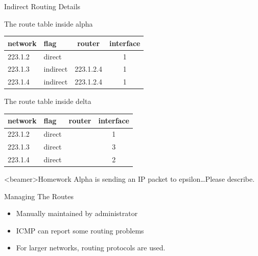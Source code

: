 \begin{frame}{Indirect Routing Details}
  \begin{iblock}{The route table inside alpha}
    \begin{center}{\ttfamily
      \begin{tabular}{llcc}
        \toprule
        \textrm{network} & \textrm{flag} & \textrm{router} & \textrm{interface}\\\midrule
        223.1.2 & direct & & 1\\
        223.1.3 & indirect & 223.1.2.4 & 1\\
        223.1.4 & indirect & 223.1.2.4 & 1\\\bottomrule
      \end{tabular}}
    \end{center}
  \end{iblock}

  \begin{iblock}{The route table inside delta}
    \begin{center}{\ttfamily
      \begin{tabular}{llcc}
        \toprule
        \textrm{network} & \textrm{flag} & \textrm{router} & \textrm{interface} \\\midrule
        223.1.2 & direct & & 1\\
        223.1.3 & direct & & 3\\
        223.1.4 & direct & & 2\\\bottomrule
      \end{tabular}}
    \end{center}
  \end{iblock}
\end{frame}

\begin{frame}<beamer>{Homework}
  Alpha is sending an IP packet to epsilon\ldots{}Please describe.
\end{frame}

\begin{frame}{Managing The Routes}
  \begin{itemize}
  \item Manually maintained by administrator
  \item ICMP can report some routing problems
  \item For larger networks, routing protocols are used.
  \end{itemize}
\end{frame}

